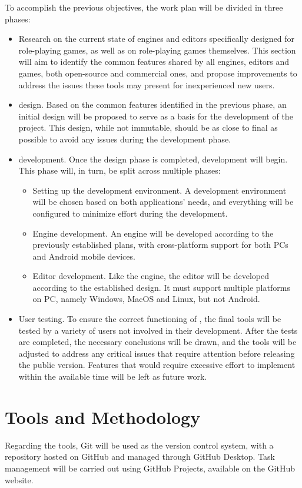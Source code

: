 To accomplish the previous objectives, the work plan will be divided in three phases: 
\begin{itemize}
	\item Research on the current state of engines and editors specifically designed for role-playing games, as well as on role-playing games themselves. This section will aim to identify the common features shared by all engines, editors and games, both open-source and commercial ones, and propose improvements to address the issues these tools may present for inexperienced new users. 
	\item \baker{} design. Based on the common features identified in the previous phase, an initial design will be proposed to serve as a basis for the development of the project. This design, while not immutable, should be as close to final as possible to avoid any issues during the development phase.
	\item \baker{} development. Once the design phase is completed, development will begin. This phase will, in turn, be split across multiple phases:
		\begin{itemize}
			\item Setting up the development environment. A development environment will be chosen based on both applications' needs, and everything will be configured to minimize effort during the development.
			\item Engine development. An engine will be developed according to the previously established plans, with cross-platform support for both PCs and Android mobile devices.
			\item Editor development. Like the engine, the editor will be developed according to the established design. It must support multiple platforms on PC, namely Windows, MacOS and Linux, but not Android.
		\end{itemize}
	\item User testing. To ensure the correct functioning of \baker, the final tools will be tested by a variety of users not involved in their development. After the tests are completed, the necessary conclusions will be drawn, and the tools will be adjusted to address any critical issues that require attention before releasing the public version. Features that would require excessive effort to implement within the available time will be left as future work.
\end{itemize}


\section*{Tools and Methodology}
Regarding the tools, Git will be used as the version control system, with a repository hosted on GitHub and managed through GitHub Desktop. Task management will be carried out using GitHub Projects, available on the GitHub website.

